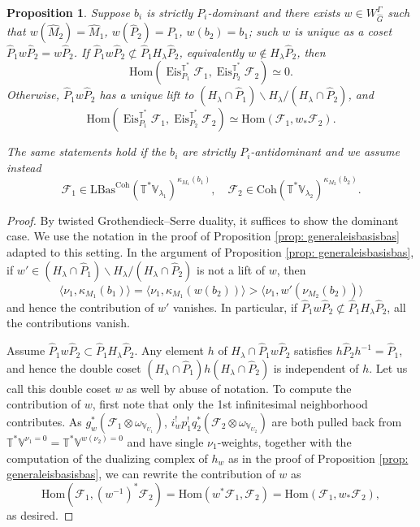 \documentclass{amsart}
\newtheorem{proposition}[theorem]{Proposition}
\theoremstyle{definition}
\theoremstyle{remark}
\numberwithin{equation}{section}
\newcommand{\mc}{\mathcal}
\newcommand{\Hom}{\mathrm{Hom}}
\newcommand{\wh}{\widehat}
\DeclareMathOperator{\Eis}{\mathrm{Eis}}
\newcommand{\Coh}{\mathrm{Coh}}
\newcommand{\V}{\mathbb{V}}
\newcommand{\T}{\mathbb{T}}
\newcommand{\LBas}{\mathrm{LBas}}
\begin{document}
\begin{proposition}{\label{prop: EisHomvanishing}}
Suppose $b_i$ is strictly $P_i$-dominant and there exists $w\in W_{\wh G}^\Gamma$ such that $w(\wh M_2)=\wh M_1$, $w(\wh P_2)=\wh P_1$, $w(b_2)=b_1$; such $w$ is unique as a coset $\wh P_1 w \wh P_2=w \wh P_2$. If $\wh P_1 w\wh P_2\not\subset \wh P_1 H_\lambda \wh P_2$, equivalently $w\not\in H_\lambda \wh P_2$,  then
\[
\Hom(\Eis^{\T^*}_{P_1}\mc F_1, \Eis^{\T^*}_{P_2}\mc F_2)\simeq 0.
\] 
Otherwise, $\wh P_1 w\wh P_2$ has a unique lift to $(H_\lambda \cap \wh P_1)\backslash H_\lambda / (H_\lambda\cap \wh P_2)$, and 
\[
\Hom(\Eis^{\T^*}_{P_1}\mc F_1, \Eis^{\T^*}_{P_2}\mc F_2)\simeq \Hom(\mc F_1, w_*\mc F_2). 
\]

The same statements hold if the $b_i$ are strictly $P_i$-antidominant and we assume instead \[
\mc F_1\in \LBas^\Coh(\T^*\V_{\lambda_1})^{\kappa_{M_1}(b_1)}, \quad \mc F_2\in \Coh(\T^*\V_{\lambda_2})^{\kappa_{M_2}(b_2)}. 
\]
\end{proposition}

\begin{proof}
By twisted Grothendieck--Serre duality, it suffices to show the dominant case. We use the notation in the proof of Proposition \ref{prop: generaleisbasisbas} adapted to this setting. In the argument of Proposition \ref{prop: generaleisbasisbas}, if $w'\in (H_\lambda \cap \wh P_1)\backslash H_\lambda /(H_\lambda\cap \wh P_2)$ is not a lift of $w$, then
\[
\langle \nu_1, \kappa_{M_1} (b_1)\rangle=\langle \nu_1, \kappa_{M_1} (w(b_2))\rangle > \langle \nu_1, w'(\nu_{M_2}(b_2))\rangle
\]
and hence the contribution of $w'$ vanishes. In particular, if $\wh P_1w \wh P_2\not \subset \wh P_1 H_\lambda \wh P_2 $, all the contributions vanish. 

Assume $\wh P_1w \wh P_2 \subset \wh P_1 H_\lambda \wh P_2 $. Any element $h$ of $H_\lambda \cap \wh P_1 w\wh P_2$ satisfies $h\wh P_2h^{-1}=\wh P_1$, and hence the double coset $(H_\lambda\cap \wh P_1) h(H_\lambda\cap \wh P_2)$ is independent of $h$. Let us call this double coset $w$ as well by abuse of notation. To compute the contribution of $w$, first note that only the 1st infinitesimal neighborhood contributes.  As $g_w^* (\mc F_1\otimes \omega_{\V_{U_1}})$, $i_w^! p_1^! q_2^* (\mc F_2\otimes \omega_{\V_{U_2}})$ are both pulled back from $\T^*\V^{\nu_1=0}=\T^*\V^{w(\nu_2)=0}$ and have single $\nu_1$-weights, together with the computation of the dualizing complex of $h_w$ as in the proof of Proposition \ref{prop: generaleisbasisbas}, we can rewrite the contribution of $w$ as
\[
\Hom(\mc F_1, (w^{-1})^* \mc F_2)=\Hom(w^*\mc F_1, \mc F_2)=\Hom(\mc F_1, w_*\mc F_2),
\]
as desired. 
\end{proof}
\end{document}
